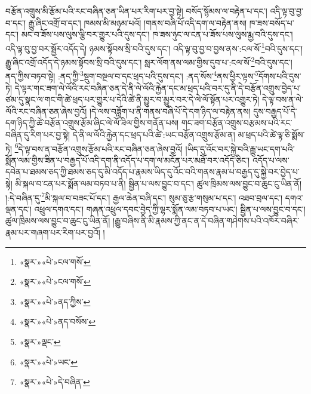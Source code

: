 བརྩོན་འགྲུས་མི་རྩོམ་པའི་རང་བཞིན་ཅན་ཡིན་པར་རིག་པར་བྱ་སྟེ། བསོད་སྙོམས་ལ་བརྟེན་པ་དང་། འདི་ལྟ་བུ་བྱ་བ་དང་། རྒྱུ་ཞིང་འགྲོ་བ་དང་། ཁམས་མི་མཉམ་པའོ། །གནས་བཞི་པོ་འདི་དག་ལ་བརྟེན་ནས། ཁ་ཟས་བསོད་པ་དང་། མང་བ་ཟོས་པས་ལུས་ལྕི་བར་གྱུར་པའི་དུས་དང་། ཁ་ཟས་ཉུང་ལ་ངན་པ་ཟོས་པས་ལུས་རྨྱ་བའི་དུས་དང་། འདི་ལྟ་བུ་བྱ་བར་སྦྱོར་འདོད་དེ། ཉམས་སྟོབས་སྲི་བའི་དུས་དང་། འདི་ལྟ་བུ་བྱ་བ་བྱས་ནས་:ངལ་སོ་\footnote{«སྣར་»«པེ་»ངལ་གསོ་}བའི་དུས་དང་། རྒྱུ་ཞིང་འགྲོ་འདོད་དེ་ཉམས་སྟོབས་སྲི་བའི་དུས་དང་། སླར་ལོག་ནས་ལམ་གྱིས་དུབ་པ་:ངལ་སོ་\footnote{«སྣར་»«པེ་»ངལ་གསོ་}བའི་དུས་དང་། ནད་ཀྱིས་བཏབ་སྟེ། :ནད་ཀྱི་\footnote{«སྣར་»«པེ་»ནད་ཀྱིས་}སྡུག་བསྔལ་བ་དང་ཕྲད་པའི་དུས་དང་། :ནད་སོས་\footnote{«སྣར་»«པེ་»ནད་བསོས་}ནས་ཕྱིར་ལྟས་\footnote{«སྣར་»ལྡང་}དོགས་པའི་དུས་ཏེ། དེ་ལྟར་གང་ཟག་ལེ་ལོའི་རང་བཞིན་ཅན་དེ་ནི་ལེ་ལོའི་རྐྱེན་དང་མ་ཕྲད་པའི་བར་དུ་ནི་དེ་བརྩོན་འགྲུས་བྱེད་པ་ཙམ་དུ་སྣང་ལ་གང་གི་ཚེ་ཕྲད་པར་གྱུར་པ་དེའི་ཚེ་ནི་མྱུར་བ་མྱུར་བར་དེ་ལེ་ལོ་སྟོན་པར་འགྱུར་ཏེ། དེ་ལྟ་བས་ན་ལེ་ལོའི་རང་བཞིན་ཅན་ཞེས་བྱའོ། །དེ་ལས་བཟློག་པ་ནི་གནས་བཞི་པོ་དེ་དག་ཉིད་ལ་བརྟེན་ནས། དུས་བརྒྱད་པོ་དེ་དག་ཉིད་ཀྱི་ཚེ་བརྩོན་འགྲུས་རྩོམ་ཞིང་ལེ་ལོ་ཟིལ་གྱིས་གནོན་པས། གང་ཟག་བརྩོན་འགྲུས་བརྩམས་པའི་རང་བཞིན་དུ་རིག་པར་བྱ་སྟེ། དེ་ནི་ལ་ལོའི་རྐྱེན་དང་ཕྲད་པའི་ཚེ་:ཡང་བརྩོན་འགྲུས་རྩོམ་ན། མ་ཕྲད་པའི་ཚེ་ལྟ་ཅི་སྨོས་ཏེ། \footnote{«སྣར་»«པེ་»ཡང་}དེ་ལྟ་བས་ན་བརྩོན་འགྲུས་རྩོམ་པའི་རང་བཞིན་ཅན་ཞེས་བྱའོ། །ཡིད་དུ་འོང་བར་སྐྱེ་བའི་རྒྱུ་ཡང་དག་པའི་སྨོན་ལམ་གྱིས་ཟིན་པ་བརྒྱད་པོ་འདི་དག་ནི་འདོད་པ་དག་ལ་མངོན་པར་མཐོ་བར་འདོད་ཅིང་། འདོད་པ་ལས་དབེན་པ་ཐམས་ཅད་ཀྱི་ཐམས་ཅད་དུ་མི་འདོད་པ་རྣམས་ཡིད་དུ་འོང་བའི་གནས་རྣམ་པ་བརྒྱད་དུ་སྐྱེ་བར་བྱེད་པ་སྟེ། མི་སྐལ་བ་ངན་པར་སྨོན་ལམ་བཏབ་པ་ནི། སྦྱིན་པ་ལས་བྱུང་བ་དང་། ཚུལ་ཁྲིམས་ལས་བྱུང་བ་ཆུང་ངུ་ཡིན་ནོ། །:དེ་བཞིན་དུ་\footnote{«སྣར་»«པེ་»དེ་བཞིན་}མི་སྐལ་བ་བཟང་པོ་དང་། རྒྱལ་ཆེན་བཞི་དང་། སུམ་ཅུ་རྩ་གསུམ་པ་དང་། འཐབ་བྲལ་དང་། དགའ་ལྡན་དང་། འཕྲུལ་དགའ་དང་། གཞན་འཕྲུལ་དབང་བྱེད་ཀྱི་ལྷར་སྨོན་ལམ་བཏབ་པ་ཡང་། སྦྱིན་པ་ལས་བྱུང་བ་དང་། ཚུལ་ཁྲིམས་ལས་བྱུང་བ་ཆུང་ངུ་ཡིན་ནོ། །རྒྱུ་བཞིས་ནི་མི་རྣམས་ཀྱི་ནང་ན་དེ་བཞིན་གཤེགས་པའི་འཁོར་བཞིར་རྣམ་པར་གཞག་པར་རིག་པར་བྱའོ། །
